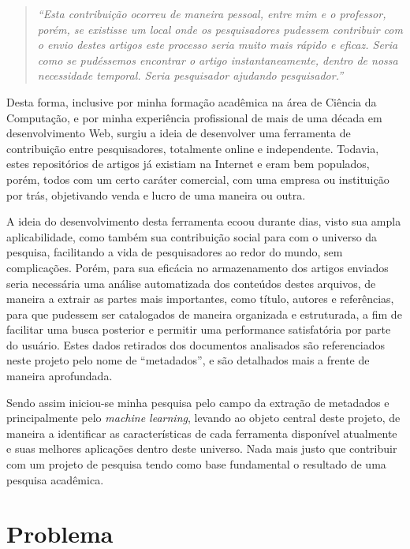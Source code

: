 \begin{quote}
	\textit{``Esta contribuição ocorreu de maneira pessoal, entre mim e o professor, porém, se existisse um local onde os pesquisadores pudessem contribuir com o envio destes artigos este processo seria muito mais rápido e eficaz. Seria como se pudéssemos encontrar o artigo instantaneamente, dentro de nossa necessidade temporal. Seria pesquisador ajudando pesquisador.''}
\end{quote}

Desta forma, inclusive por minha formação acadêmica na área de Ciência da Computação, e por minha experiência profissional de mais de uma década em desenvolvimento Web, surgiu a ideia de desenvolver uma ferramenta de contribuição entre pesquisadores, totalmente online e independente. Todavia, estes repositórios de artigos já existiam na Internet e eram bem populados, porém, todos com um certo caráter comercial, com uma empresa ou instituição por trás, objetivando venda e lucro de uma maneira ou outra.

A ideia do desenvolvimento desta ferramenta ecoou durante dias, visto sua ampla aplicabilidade, como também sua contribuição social para com o universo da pesquisa, facilitando a vida de pesquisadores ao redor do mundo, sem complicações. Porém, para sua eficácia no armazenamento dos artigos enviados seria necessária uma análise automatizada dos conteúdos destes arquivos, de maneira a extrair as partes mais importantes, como título, autores e referências, para que pudessem ser catalogados de maneira organizada e estruturada, a fim de facilitar uma busca posterior e permitir uma performance satisfatória por parte do usuário. Estes dados retirados dos documentos analisados são referenciados neste projeto pelo nome de ``metadados'', e são detalhados mais a frente de maneira aprofundada.

Sendo assim iniciou-se minha pesquisa pelo campo da extração de metadados e principalmente pelo \textit{machine learning}, levando ao objeto central deste projeto, de maneira a identificar as características de cada ferramenta disponível atualmente e suas melhores aplicações dentro deste universo. Nada mais justo que contribuir com um projeto de pesquisa tendo como base fundamental o resultado de uma pesquisa acadêmica.

\section{Problema}
\label{sec:problem}

